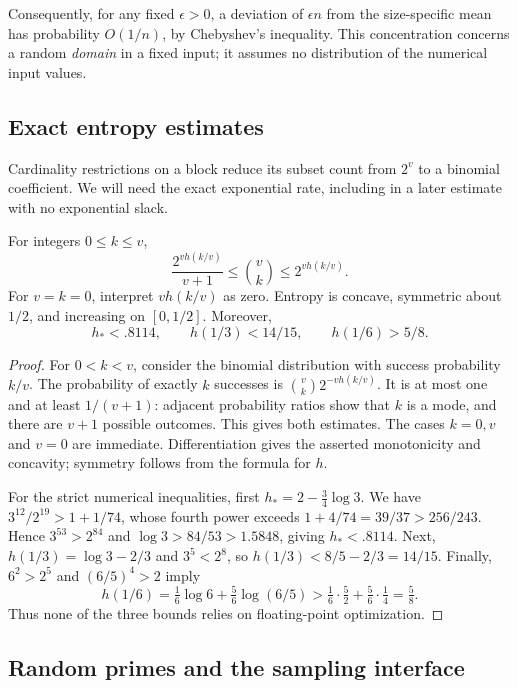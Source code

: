 Consequently, for any fixed $\epsilon>0$, a deviation of
$\epsilon n$ from the size-specific mean has probability $O(1/n)$,
by Chebyshev's inequality. This concentration concerns a random
\emph{domain} in a fixed input; it assumes no distribution of the
numerical input values.

\subsection{Exact entropy estimates}

Cardinality restrictions on a block reduce its subset count from
$2^v$ to a binomial coefficient. We will need the exact exponential
rate, including in a later estimate with no exponential slack.

\begin{lemma}
\label{lem:entropy}
For integers $0\le k\le v$,
\[
 \frac{2^{v h(k/v)}}{v+1}\le \binom vk\le 2^{v h(k/v)}.
\]
For $v=k=0$, interpret $v h(k/v)$ as zero. Entropy is concave,
symmetric about $1/2$, and increasing on $[0,1/2]$. Moreover,
\begin{equation}
\label{eq:entropy-numbers}
 h_*<.8114,\qquad h(1/3)<14/15,\qquad h(1/6)>5/8.
\end{equation}
\end{lemma}

\begin{proof}
For $0<k<v$, consider the binomial distribution with success
probability $k/v$. The probability of exactly $k$ successes is
$\binom vk 2^{-v h(k/v)}$. It is at most one and at least
$1/(v+1)$: adjacent probability ratios show that $k$ is a mode,
and there are $v+1$ possible outcomes. This gives both estimates.
The cases $k=0,v$ and $v=0$ are immediate. Differentiation gives
the asserted monotonicity and concavity; symmetry follows from the
formula for $h$.

For the strict numerical inequalities, first
$h_*=2-\tfrac34\log3$. We have
$3^{12}/2^{19}>1+1/74$, whose fourth power exceeds
$1+4/74=39/37>256/243$. Hence $3^{53}>2^{84}$ and
$\log3>84/53>1.5848$, giving $h_*<.8114$.
Next, $h(1/3)=\log3-2/3$ and $3^5<2^8$, so
$h(1/3)<8/5-2/3=14/15$.
Finally, $6^2>2^5$ and $(6/5)^4>2$ imply
\[
 h(1/6)=\tfrac16\log6+\tfrac56\log(6/5)
 >\tfrac16\cdot\tfrac52+\tfrac56\cdot\tfrac14=\tfrac58.
\]
Thus none of the three bounds relies on floating-point optimization.
\end{proof}

\subsection{Random primes and the sampling interface}

